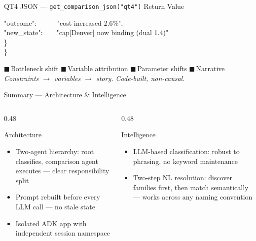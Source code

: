 \documentclass[aspectratio=169,10pt]{beamer}
\begin{document}
\begin{frame}[t]{QT4 JSON — \texttt{get\_comparison\_json("qt4")} Return Value}
\begin{block}{}
{    \quad\quad "outcome":\ \ \ \ \ \ "cost increased 2.6\%",\\
    \quad\quad "new\_state":\ \ \ \ "cap[Denver] now binding (dual 1.4)"\\
    \quad \}\\
    \}
  }
\end{block}
\vspace{1pt}
\centering\scriptsize
\textcolor{ared}{$\blacksquare$}\,Bottleneck shift\quad
\textcolor{purp}{$\blacksquare$}\,Variable attribution\quad
\textcolor{aorng}{$\blacksquare$}\,Parameter shifts\quad
\textcolor{pblue}{$\blacksquare$}\,Narrative\qquad
\textcolor{mgray}{\textit{Constraints $\to$ variables $\to$ story. Code-built, non-causal.}}
\end{frame}

\begin{frame}{Summary — Architecture \& Intelligence}
\begin{columns}[T]
  \begin{column}{0.48\textwidth}
    \begin{block}{Architecture}
      \begin{itemize}\setlength\itemsep{4pt}
        \item Two-agent hierarchy: root classifies,
              comparison agent executes — clear responsibility split
        \item Prompt rebuilt before every LLM call — no stale state
        \item Isolated ADK app with independent session namespace
      \end{itemize}
    \end{block}
  \end{column}
  \begin{column}{0.48\textwidth}
    \begin{block}{Intelligence}
      \begin{itemize}\setlength\itemsep{4pt}
        \item LLM-based classification: robust to phrasing,
              no keyword maintenance
        \item Two-step NL resolution: discover families first,
              then match semantically — works across any naming convention
      \end{itemize}
    \end{block}
  \end{column}
\end{columns}
\end{frame}
\end{document}

